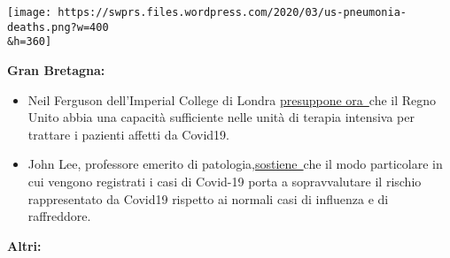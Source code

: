 \texttt{[image: https://swprs.files.wordpress.com/2020/03/us-pneumonia-deaths.png?w=400\\\&h=360]}

\textbf{Gran Bretagna:}

\begin{itemize}
\tightlist
\item
  Neil Ferguson dell'Imperial College di Londra
  \href{https://www.newscientist.com/article/2238578-uk-has-enough-intensive-care-units-for-coronavirus-expert-predicts/}{presuppone
  ora~}che il Regno Unito abbia una capacità sufficiente nelle unità di
  terapia intensiva per trattare i pazienti affetti da Covid19.
\item
  John Lee, professore emerito di
  patologia,\href{https://www.spectator.co.uk/article/The-evidence-on-Covid-19-is-not-as-clear-as-we-think}{sostiene~}che
  il modo particolare in cui vengono registrati i casi di Covid-19 porta
  a sopravvalutare il rischio rappresentato da Covid19 rispetto ai
  normali casi di influenza e di raffreddore.\\
\end{itemize}

\textbf{Altri:}

